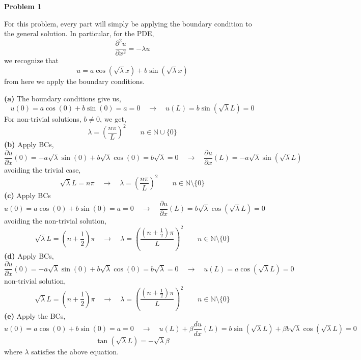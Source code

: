 \documentclass[10pt]{article}
\begin{document}
\textbf{Problem 1}

For this problem, every part will simply be applying the boundary condition to the general solution. In particular, for the PDE,
$$\frac{\partial^{2}u}{\partial x^{2}} = -\lambda u$$
we recognize that
$$u = a\cos(\sqrt{\lambda} x) + b\sin(\sqrt{\lambda} x)$$
from here we apply the boundary conditions.

\textbf{(a)}
The boundary conditions give us,
$$u(0) = a\cos(0) + b\sin(0) = a = 0 \hspace{1em} \to \hspace{1em} u(L) = b\sin(\sqrt{\lambda}L) = 0$$
For non-trivial solutions, $b\neq 0$, we get,
$$\lambda = \left(\frac{n\pi}{L}\right)^{2} \hspace{2em} n \in \mathbb{N} \cup\{0\}$$
\textbf{(b)}
Apply BCs,
$$\frac{\partial u}{\partial x}(0) = -a\sqrt{\lambda}\sin(0) + b\sqrt{\lambda}\cos(0) = b\sqrt{\lambda} = 0 \hspace{1em} \to \hspace{1em} \frac{\partial u}{\partial x}(L) = -a\sqrt{\lambda}\sin(\sqrt{\lambda}L)$$
avoiding the trivial case,
$$\sqrt{\lambda}L = n\pi \hspace{1em} \to \hspace{1em} \lambda = \left(\frac{n\pi}{L}\right)^{2}\hspace{2em} n\in\mathbb{N}\setminus\{0\}$$
\textbf{(c)}
Apply BCs
$$u(0) = a\cos(0) + b\sin(0) = a = 0 \hspace{1em} \to \hspace{1em} \frac{\partial u}{\partial x}(L) = b\sqrt{\lambda}\cos(\sqrt{\lambda}L) = 0$$
avoiding the non-trivial solution,
$$\sqrt{\lambda}L= \left(n+\frac{1}{2}\right)\pi \hspace{1em} \to \hspace{1em} \lambda = \left(\frac{(n+\frac{1}{2})\pi}{L}\right)^{2} \hspace{2em} n\in\mathbb{N}\setminus\{0\}$$
\textbf{(d)}
Apply BCs,
$$\frac{\partial u}{\partial x}(0) = -a\sqrt{\lambda}\sin(0) + b\sqrt{\lambda}\cos(0) = b\sqrt{\lambda} = 0 \hspace{1em} \to \hspace{1em} u(L) = a\cos(\sqrt{\lambda}L) = 0$$
non-trivial solution,
$$\sqrt{\lambda}L= \left(n+\frac{1}{2}\right)\pi \hspace{1em} \to \hspace{1em} \lambda = \left(\frac{(n+\frac{1}{2})\pi}{L}\right)^{2} \hspace{2em} n\in\mathbb{N}\setminus\{0\}$$
\textbf{(e)}
Apply the BCs,
$$u(0) = a\cos(0) + b\sin(0) = a = 0 \hspace{1em} \to \hspace{1em}u(L) + \beta \frac{du}{dx}(L) = b\sin(\sqrt{\lambda}L) + \beta b\sqrt{\lambda}\cos(\sqrt{\lambda}L) = 0$$
$$\tan(\sqrt{\lambda}L) = -\sqrt{\lambda}\beta$$
where $\lambda$ satisfies the above equation.
\end{document}
